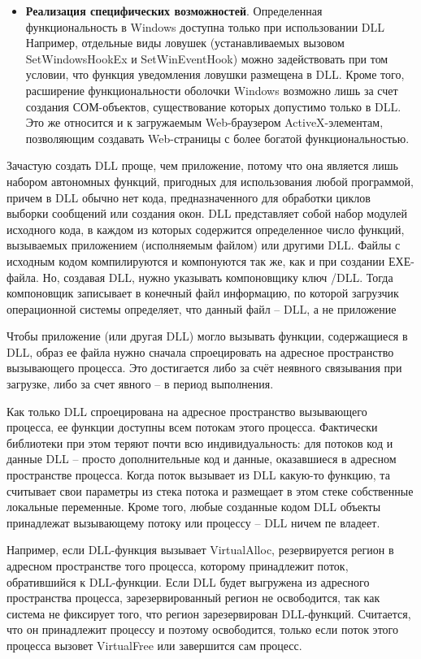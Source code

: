 \begin{itemize}
\item \textbf{Реализация специфических возможностей}. Определенная функциональность в Windows доступна только при использовании DLL Например, отдельные виды ловушек (устанавливаемых вызовом SetWindowsHookEx и SetWinEventHook) можно задействовать при том условии, что функция уведомления ловушки размещена в DLL. Кроме того, расширение функциональности оболочки Windows возможно лишь за счет создания СОМ-объектов, существование которых допустимо только в DLL. Это же относится и к загружаемым Web-браузером ActiveX-элементам, позволяющим создавать Web-страницы с более богатой функциональностью.
\end{itemize}

Зачастую создать DLL проще, чем приложение, потому что она является лишь набором автономных функций, пригодных для использования любой программой, причем в DLL обычно нет кода, предназначенного для обработки циклов выборки сообщений или создания окон. DLL представляет собой набор модулей исходного кода, в каждом из которых содержится определенное число функций, вызываемых приложением (исполняемым файлом) или другими DLL. Файлы с исходным кодом компилируются и компонуются так же, как и при создании ЕХЕ-файла. Но, создавая DLL, нужно указывать компоновщику ключ /DLL. Тогда компоновщик записывает в конечный файл информацию, по которой загрузчик операционной системы определяет, что данный файл -- DLL, а не приложение

Чтобы приложение (или другая DLL) могло вызывать функции, содержащиеся в DLL, образ ее файла нужно сначала спроецировать на адресное пространство вызывающего процесса. Это достигается либо за счёт неявного связывания при загрузке, либо за счет явного -- в период выполнения.

Как только DLL спроецирована на адресное пространство вызывающего процесса, ее функции доступны всем потокам этого процесса. Фактически библиотеки при этом теряют почти всю индивидуальность: для потоков код и данные DLL -- просто дополнительные код и данные, оказавшиеся в адресном пространстве процесса. Когда поток вызывает из DLL какую-то функцию, та считывает свои параметры из стека потока и размещает в этом стеке собственные локальные переменные. Кроме того, любые созданные кодом DLL объекты принадлежат вызывающему потоку или процессу -- DLL ничем пе владеет.

Например, если DLL-функция вызывает VirtualAlloc, резервируется регион в адресном пространстве того процесса, которому принадлежит поток, обратившийся к DLL-функции. Если DLL будет выгружена из адресного пространства процесса, зарезервированный регион не освободится, так как система не фиксирует того, что регион зарезервирован DLL-функций. Считается, что он принадлежит процессу и поэтому освободится, только если поток этого процесса вызовет VirtualFree или завершится сам процесс.

